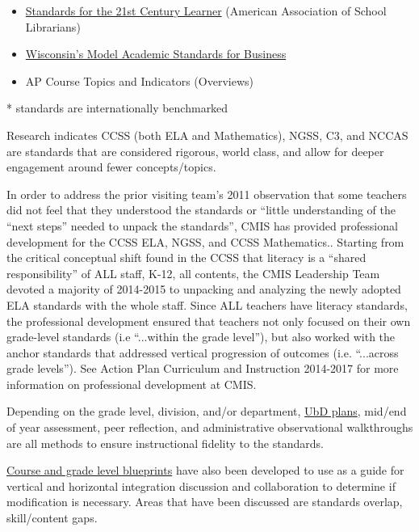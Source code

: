 \begin{findings}
\begin{itemize}
\item \href{https://drive.google.com/a/cmis.ac.th/file/d/0ByVFfrm0zfolM0VpbFNHNXlfbGs/view?usp=sharing}{Standards for the 21st Century Learner} (American Association of School Librarians)
\item \href{https://drive.google.com/a/cmis.ac.th/file/d/0ByVFfrm0zfolMTU1cXlocHR0dGs/view?usp=sharing}{Wisconsin’s Model Academic Standards for Business}  
\item AP Course Topics and Indicators  (Overviews)
\end{itemize}
* standards are internationally benchmarked 

Research indicates CCSS (both ELA and Mathematics), NGSS, C3, and NCCAS are standards that are considered rigorous, world class, and allow for deeper engagement around fewer concepts/topics.

 
In order to address the prior visiting team’s 2011 observation that some teachers did not feel that they understood the standards or “little understanding of the “next steps” needed to unpack the standards”, CMIS has provided professional development for the CCSS ELA, NGSS, and CCSS Mathematics.. Starting from the critical conceptual shift found in the CCSS that literacy is a “shared responsibility” of ALL staff, K-12, all contents, the CMIS Leadership Team devoted a majority of 2014-2015 to unpacking and analyzing the newly adopted ELA standards with the whole staff.  Since ALL teachers have literacy standards, the professional development ensured that teachers not only focused on their own grade-level standards (i.e “...within the grade level”), but also worked with the anchor standards that addressed vertical progression of outcomes (i.e. “...across grade levels”). See Action Plan Curriculum and Instruction 2014-2017 for more information on professional development at CMIS.


Depending on the grade level, division, and/or department, \href{https://docs.google.com/a/cmis.ac.th/document/d/1kL1VjwfuMMa7NaWmwUrEah1BM-jJRmLAd4VJzR3HoPs/edit?usp=sharing}{UbD plans}, mid/end of year assessment, peer reflection, and administrative observational walkthroughs are all methods to ensure instructional fidelity to the standards. 

\href{https://drive.google.com/drive/folders/0ByVFfrm0zfolfmV1QTNuWFdUVHV3dDVrRFMzUFBMazY0VGs1eWc0cmFjVGcwNDdsQkdrZzA?usp=sharing}{Course and grade level blueprints} have also been developed to use as a guide for vertical and horizontal integration discussion and collaboration to determine if modification is necessary. Areas that have been discussed are standards overlap, skill/content gaps. 


\end{findings}
